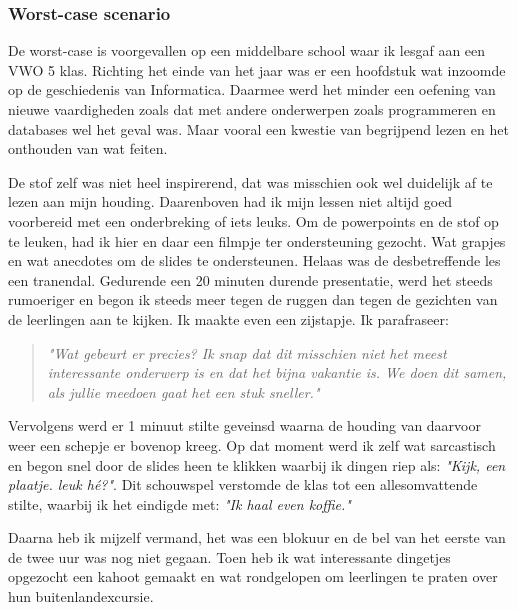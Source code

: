 \subsubsection{Worst-case scenario}
De worst-case is voorgevallen op een middelbare school waar ik lesgaf aan een VWO 5 klas. Richting het einde van het jaar was er een hoofdstuk wat inzoomde op de geschiedenis van Informatica. Daarmee werd het minder een oefening van nieuwe vaardigheden zoals dat met andere onderwerpen zoals programmeren en databases wel het geval was. Maar vooral een kwestie van begrijpend lezen en het onthouden van wat feiten.

De stof zelf was niet heel inspirerend, dat was misschien ook wel duidelijk af te lezen aan mijn houding. Daarenboven had ik mijn lessen niet altijd goed voorbereid met een onderbreking of iets leuks. Om de powerpoints en de stof op te leuken, had ik hier en daar een filmpje ter ondersteuning gezocht. Wat grapjes en wat anecdotes om de slides te ondersteunen. Helaas was de desbetreffende les een tranendal. Gedurende een 20 minuten durende presentatie, werd het steeds rumoeriger en begon ik steeds meer tegen de ruggen dan tegen de gezichten van de leerlingen aan te kijken. Ik maakte even een zijstapje. Ik parafraseer:
\begin{quote}
  \textit{"Wat gebeurt er precies? Ik snap dat dit misschien niet het meest interessante onderwerp is en dat het bijna vakantie is. We doen dit samen, als jullie meedoen gaat het een stuk sneller."}
\end{quote}

Vervolgens werd er 1 minuut stilte geveinsd waarna de houding van daarvoor weer een schepje er bovenop kreeg. Op dat moment werd ik zelf wat sarcastisch en begon snel door de slides heen te klikken waarbij ik dingen riep als: \textit{"Kijk, een plaatje. leuk hé?"}. Dit schouwspel verstomde de klas tot een allesomvattende stilte, waarbij ik het eindigde met: \textit{"Ik haal even koffie."}

Daarna heb ik mijzelf vermand, het was een blokuur en de bel van het eerste van de twee uur was nog niet gegaan. Toen heb ik wat interessante dingetjes opgezocht een kahoot gemaakt en wat rondgelopen om leerlingen te praten over hun buitenlandexcursie.

